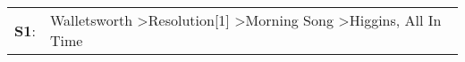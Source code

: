 \begin{supertabular}{p{0.03\textwidth}p{0.92\textwidth}}
 \textbf{S1}:  &  Walletsworth\textsuperscript{} \textgreater \enspace Resolution[1]\textsuperscript{} \textgreater \enspace Morning Song\textsuperscript{} \textgreater \enspace Higgins\textsuperscript{}, \enspace All In Time\textsuperscript{}  \enspace  \\
\end{supertabular}
